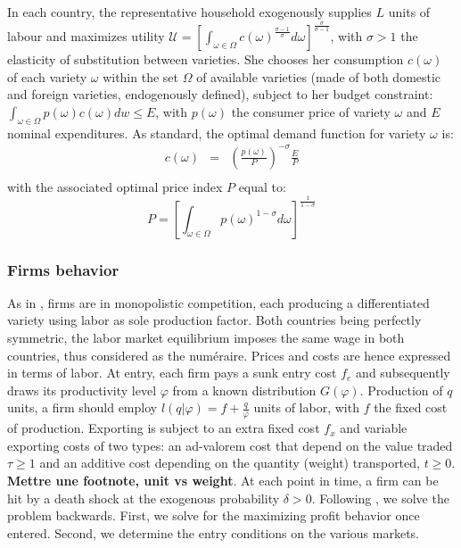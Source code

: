 \documentclass[a4paper,11pt]{article}
\begin{document}
In each country, the representative household exogenously supplies $L$ units of labour and maximizes utility $\mathcal{U} = \left[ \int_{\omega \in \Omega}c(\omega)^{\frac{\sigma-1}{\sigma}} d\omega \right]^{\frac{\sigma}{\sigma-1}}$, with $\sigma>1$ the elasticity of substitution between varieties. She chooses her consumption $c(\omega)$  of each variety $\omega$ within the set $\Omega$ of available varieties (made of both domestic and foreign varieties, endogenously defined), subject to her budget constraint: $\int_{\omega \in \Omega} p(\omega) c(\omega) dw \leq E$, with $p(\omega)$ the consumer price of variety $\omega$ and $E$ nominal expenditures. As standard, the optimal demand function for variety $\omega$ is:
\begin{eqnarray*}
c(\omega) &=& \left(\frac{p(\omega)}{P}  \right)^{-\sigma} \frac{E}{P}\\
\end{eqnarray*}
\noindent with the associated optimal price index $P$ equal to:
\begin{equation}
P = \left[ \int_{\omega \in \Omega}p(\omega)^{1-\sigma}d\omega\right]^{\frac{1}{1-\sigma}} \label{eq:CPI}
\end{equation}


\subsubsection{Firms behavior}

As in \cite{melitz}, firms are in monopolistic competition, each producing a differentiated variety using labor as sole production factor. Both countries being perfectly symmetric, the labor market equilibrium imposes the same wage in both countries, thus considered as the num\'{e}raire. Prices and costs are hence expressed in terms of labor. At entry, each firm pays a sunk entry cost $f_e$ and subsequently draws its productivity level $\varphi$ from a known distribution $G(\varphi)$. Production of $q$ units, a firm should employ $l(q|\varphi) = f+\frac{q}{\varphi}$ units of labor, with $f$ the fixed cost of production. Exporting is subject to an extra fixed cost $f_x$ and variable exporting costs of two types: an ad-valorem cost that depend on the value traded $\tau\geq 1$ and an additive cost depending on the quantity (weight) transported, $t\geq 0$. \textbf{Mettre une footnote, unit vs weight}. At each point in time, a firm can be hit by a death shock at the exogenous probability $\delta>0$. Following \cite{melitz}, we solve the problem backwards. First, we solve for the maximizing profit behavior once entered. Second, we determine the entry conditions on the various markets.\medskip
\end{document}
